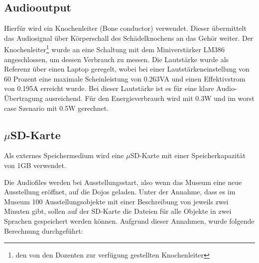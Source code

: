 \subsection{Audiooutput}
Hierfür wird ein Knochenleiter (Bone conductor) verwendet. Dieser übermittelt das Audiosignal über Körperschall des Schädelknochens an das Gehör weiter.
\newline
Der Knochenleiter\footnote{den von den Dozenten zur verfügung gestellten Knochenleiter} wurde an eine Schaltung mit dem Miniverstärker LM386 angeschlossen, um dessen Verbrauch zu messen. Die Lautstärke wurde als Referenz über einen Laptop geregelt, wobei bei einer Lautstärkeneinstellung von 60 Prozent eine maximale Scheinleistung von 0.263VA und einen Effektivstrom von 0.195A erreicht wurde. Bei dieser Lautstärke ist es für eine klare Audio-Übertragung ausreichend. Für den Energieverbrauch wird mit 0.3W und im worst case Szenario mit 0.5W gerechnet.

\subsection{$\mu$SD-Karte}
Als externes Speichermedium wird eine $\mu$SD-Karte mit einer Speicherkapazität von 1GB verwendet.

Die Audiofiles werden bei Ausstellungsstart, also wenn das Museum eine neue Ausstellung eröffnet, auf die Dojos geladen. Unter der Annahme, dass es im Museum 100 Ausstellungsobjekte mit einer Beschreibung von jeweils zwei Minuten gibt, sollen auf der SD-Karte die Dateien für alle Objekte in zwei Sprachen gespeichert werden können. Aufgrund dieser Annahmen, wurde folgende Berechnung durchgeführt:
